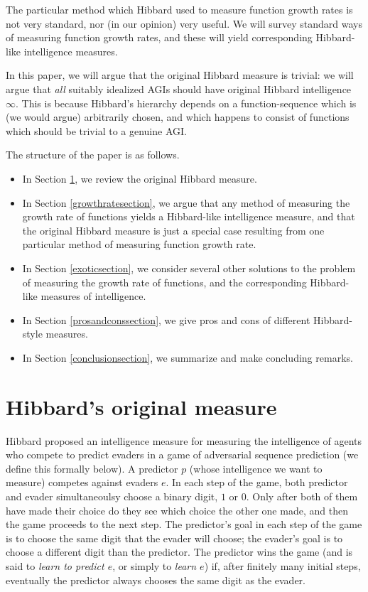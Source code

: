 \documentclass{article}
\begin{document}
The particular method which Hibbard used to measure function growth rates is
not very standard, nor (in our opinion) very useful. We will survey standard
ways of measuring function growth rates, and these will yield corresponding
Hibbard-like intelligence measures.

In this paper, we will argue that the original Hibbard measure is
trivial: we will argue that \emph{all} suitably idealized AGIs should have
original Hibbard intelligence $\infty$. This is because Hibbard's hierarchy
depends on a function-sequence which is (we would argue) arbitrarily chosen,
and which happens to consist of functions which should be trivial to a genuine AGI.

The structure of the paper is as follows.
\begin{itemize}
    \item
    In Section \ref{originalmeasuresection}, we review the original Hibbard measure.
    \item
    In Section \ref{growthratesection}, we argue that any method of measuring
    the growth rate of functions yields a Hibbard-like intelligence measure,
    and that the original Hibbard measure is just a special case resulting from
    one particular method of measuring function growth rate.
    \item
    In Section \ref{exoticsection}, we consider several other solutions to
    the problem of measuring the growth rate of functions, and the
    corresponding Hibbard-like measures of intelligence.
    \item
    In Section \ref{prosandconssection}, we give pros and cons of different
    Hibbard-style measures.
    \item
    In Section \ref{conclusionsection}, we summarize and make concluding remarks.
\end{itemize}

\section{Hibbard's original measure}
\label{originalmeasuresection}

Hibbard proposed an intelligence measure for measuring the intelligence
of agents who compete to predict evaders in a game of
adversarial sequence prediction (we define this
formally below). A predictor $p$ (whose intelligence we want to measure)
competes against evaders $e$. In each step of the game,
both predictor and evader simultaneoulsy choose a binary digit, $1$ or $0$.
Only after both of them have made their choice do they see which choice the other
one made, and then the game proceeds to the next step. The predictor's goal in
each step of the game is to choose the same digit that the evader will choose;
the evader's goal is to choose a different digit than the predictor. The predictor
wins the game (and is said to \emph{learn to predict $e$}, or simply to
\emph{learn $e$}) if, after finitely many
initial steps, eventually the predictor always chooses the same digit as the
evader.
\end{document}
